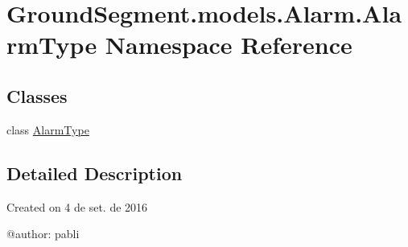 \hypertarget{namespace_ground_segment_1_1models_1_1_alarm_1_1_alarm_type}{}\section{Ground\+Segment.\+models.\+Alarm.\+Alarm\+Type Namespace Reference}
\label{namespace_ground_segment_1_1models_1_1_alarm_1_1_alarm_type}
\subsection*{Classes}
\begin{DoxyCompactItemize}
\item 
class \hyperlink{class_ground_segment_1_1models_1_1_alarm_1_1_alarm_type_1_1_alarm_type}{Alarm\+Type}
\end{DoxyCompactItemize}


\subsection{Detailed Description}
\begin{DoxyVerb}Created on 4 de set. de 2016

@author: pabli
\end{DoxyVerb}
 